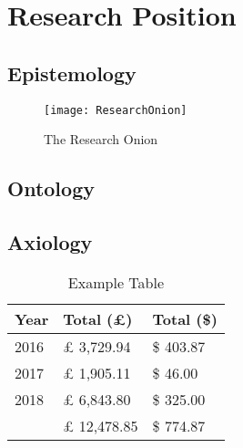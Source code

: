 \section{Research Position}
\lipsum[1]
\subsection{Epistemology}
\lipsum[1] 

\begin{figure}[ht]
    \centering
    \texttt{[image: ResearchOnion]}
    \caption{The Research Onion}
    \label{fig:research-onion}
\end{figure}

\subsection{Ontology}
\lipsum[1]
\subsection{Axiology}
\lipsum[1]
\begin{table}[]
\begin{center}

\begin{tabular}{|l|l|l|}
\hline
Year & Total (£)   & Total (\$) \\ \hline
2016 & £ 3,729.94  & \$ 403.87  \\ \hline
2017 & £ 1,905.11  & \$ 46.00   \\ \hline
2018 & £ 6,843.80  & \$ 325.00  \\ \hline
     & £ 12,478.85 & \$ 774.87  \\ \hline
\end{tabular}
\caption{Example Table}
\label{table:Example Table}
\end{center}
\end{table} 